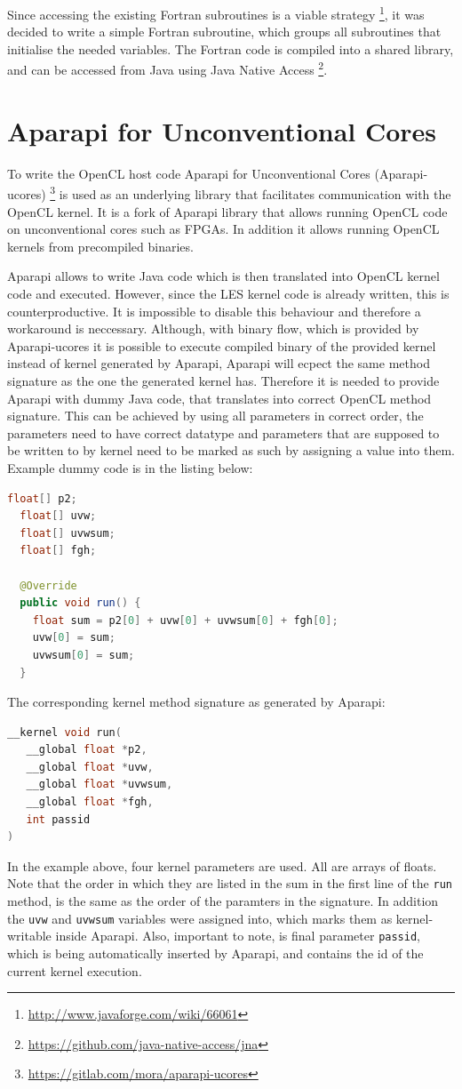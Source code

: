 \documentclass{l4proj}
\begin{document}
Since accessing the existing Fortran subroutines is a viable strategy
\footnote{\url{http://www.javaforge.com/wiki/66061}},
it was decided to write a simple Fortran subroutine, which groups 
all subroutines that initialise the needed variables. The Fortran code
is compiled into a shared library, and can be accessed from Java using
Java Native Access \footnote{\url{https://github.com/java-native-access/jna}}.

\section{Aparapi for Unconventional Cores}

To write the OpenCL host code Aparapi for Unconventional Cores (Aparapi-ucores)
\cite{aparapi_ucores}
\footnote{\url{https://gitlab.com/mora/aparapi-ucores}}
is used as an underlying library that facilitates communication
with the OpenCL kernel. It is a fork of Aparapi library that allows
running OpenCL code on unconventional cores such as FPGAs. In addition
it allows running OpenCL kernels from precompiled binaries.

Aparapi allows to write Java code which is then translated into OpenCL kernel code
and executed. However, since the LES kernel code is already written, this is 
counterproductive. It is impossible to disable this behaviour and therefore a 
workaround is neccessary. Although, with binary flow, which is provided by Aparapi-ucores
it is possible to execute compiled binary of the provided kernel instead of 
kernel generated by Aparapi, Aparapi will ecpect the same method signature as 
the one the generated kernel has. Therefore it is needed to provide Aparapi with
dummy Java code, that translates into correct OpenCL method signature.
This can be achieved by using all parameters in correct order, the parameters
need to have correct datatype and parameters that are supposed to be written to
by kernel need to be marked as such by assigning a value into them. Example dummy
code is in the listing below:

\begin{lstlisting}[language=Java]
  float[] p2;
  float[] uvw;
  float[] uvwsum;
  float[] fgh;

  @Override
  public void run() {
    float sum = p2[0] + uvw[0] + uvwsum[0] + fgh[0];
    uvw[0] = sum;
    uvwsum[0] = sum;
  }
\end{lstlisting}
The corresponding kernel method signature as generated by Aparapi:
\begin{lstlisting}[language=C]
__kernel void run(
   __global float *p2, 
   __global float *uvw, 
   __global float *uvwsum, 
   __global float *fgh,
   int passid
)
\end{lstlisting}
In the example above, four kernel parameters are used. All are arrays of floats.
Note that the order in which they are listed in the sum in the first line of the 
\texttt{run} method, is the same as the order of the paramters in the signature.
In addition the \texttt{uvw} and \texttt{uvwsum} variables were assigned into,
which marks them as kernel-writable inside Aparapi. Also, important to note,
is final parameter \texttt{passid}, which is being automatically inserted by Aparapi,
and contains the id of the current kernel execution.
\end{document}
